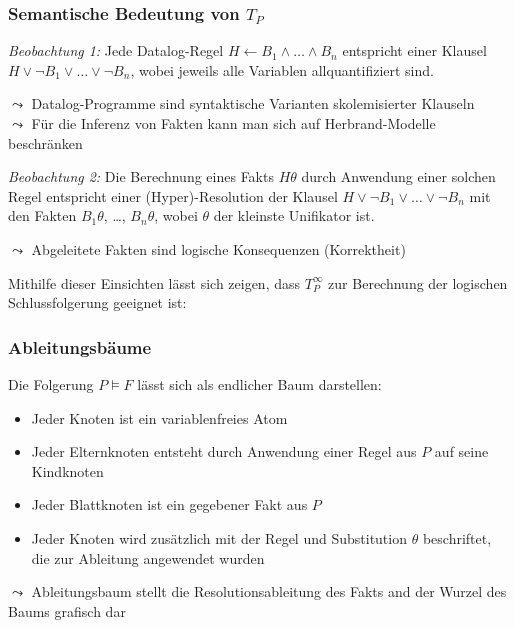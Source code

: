 \documentclass[aspectratio=1610,onlymath]{beamer}
\begin{document}
\begin{frame}\frametitle{Semantische Bedeutung von $T_P$}

\emph{Beobachtung 1:} Jede Datalog-Regel $H\leftarrow B_1\wedge\ldots\wedge B_n$ entspricht einer
Klausel $H\vee\neg B_1\vee\ldots\vee\neg B_n$, wobei jeweils alle Variablen allquantifiziert sind.
\medskip\pause

$\leadsto$ Datalog-Programme sind syntaktische Varianten skolemisierter Klauseln\\
$\leadsto$ Für die Inferenz von Fakten kann man sich auf Herbrand-Modelle beschränken\bigskip\pause

\emph{Beobachtung 2:} Die Berechnung eines Fakts $H\theta$ durch Anwendung einer solchen Regel entspricht einer (Hyper)-Resolution der Klausel $H\vee\neg B_1\vee\ldots\vee\neg B_n$ mit den Fakten $B_1\theta$, \ldots, $B_n\theta$, wobei $\theta$ der kleinste Unifikator ist.\medskip\pause

$\leadsto$ Abgeleitete Fakten sind logische Konsequenzen (Korrektheit)\bigskip\pause

Mithilfe dieser Einsichten lässt sich zeigen, dass $T_P^\infty$ zur Berechnung der logischen Schlussfolgerung geeignet ist:


\end{frame}

\begin{frame}\frametitle{Ableitungsbäume}

Die Folgerung $P\models F$ lässt sich als endlicher Baum darstellen:
\begin{itemize}
\item Jeder Knoten ist ein variablenfreies Atom
\item Jeder Elternknoten entsteht durch Anwendung einer Regel aus $P$ auf seine Kindknoten
\item Jeder Blattknoten ist ein gegebener Fakt aus $P$
\item Jeder Knoten wird zusätzlich mit der Regel und Substitution $\theta$ beschriftet, die zur Ableitung angewendet wurden
\end{itemize}
$\leadsto$ Ableitungsbaum stellt die Resolutionsableitung des Fakts and der Wurzel des Baums grafisch dar
\bigskip


\end{frame}
\end{document}
